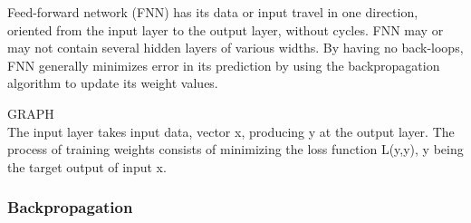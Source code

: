 
Feed-forward network (FNN) has its data or input travel in one direction, oriented from the input layer to the output layer, without cycles.\cite{6typeann}
FNN may or may not contain several hidden layers of various widths. By having no back-loops, FNN generally minimizes error in its prediction by using the backpropagation algorithm to update its weight values.
\cite{mainTypesANN}

GRAPH\\

The input layer takes input data, vector x, producing y at the output layer. The process of training weights
 consists of minimizing the loss function L(y,y), y being the target output of input x.\cite{lipton2015critical}

\subsubsection{Backpropagation}

